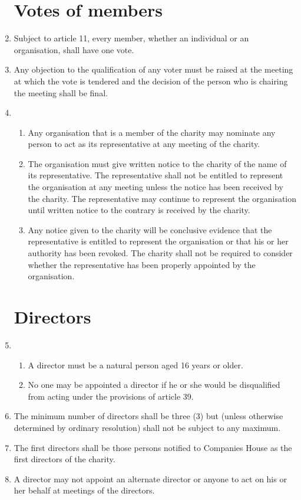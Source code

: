\documentclass{article}
\begin{document}
\begin{enumerate}[label=\arabic*, start=23]
    \section{Votes of members}
    \item  Subject to article 11, every member, whether an individual or an
    organisation, shall have one vote.
    \item  Any objection to the qualification of any voter must be raised at the
    meeting at which the vote is tendered and the decision of the person
    who is chairing the meeting shall be final.
    \item \begin{enumerate}[label=(\arabic*)]
        \item Any organisation that is a member of the charity may
        nominate any person to act as its representative at any meeting
        of the charity.
        \item  The organisation must give written notice to the charity of the
        name of its representative. The representative shall not be
        entitled to represent the organisation at any meeting unless the
        notice has been received by the charity. The representative may
        continue to represent the organisation until written notice to the
        contrary is received by the charity.
        \item  Any notice given to the charity will be conclusive evidence that
        the representative is entitled to represent the organisation or
        that his or her authority has been revoked. The charity shall not
        be required to consider whether the representative has been
        properly appointed by the organisation.
    \end{enumerate}
    
    \section{Directors}
    \item \begin{enumerate}[label=(\arabic*)]
        \item A director must be a natural person aged 16 years or older.
        \item No one may be appointed a director if he or she would be
        disqualified from acting under the provisions of article 39.
    \end{enumerate}
    \item The minimum number of directors shall be three (3) but (unless
    otherwise determined by ordinary resolution) shall not be subject
    to any maximum.
    \item The first directors shall be those persons notified to Companies House as
    the first directors of the charity.
    \item A director may not appoint an alternate director or anyone to act on his
    or her behalf at meetings of the directors.
    

\end{enumerate}
\end{document}
